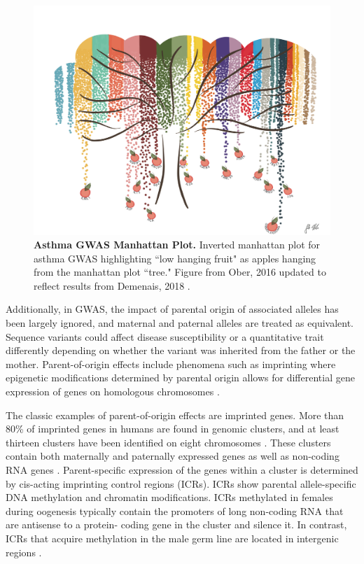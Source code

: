 \begin{figure}
\centering
\includegraphics[width=5in]{img/ch01/fig-01-lowhangingfruit.pdf}
\caption[Asthma GWAS Manhattan Plot.]{\textbf{Asthma GWAS Manhattan Plot.} Inverted manhattan plot for asthma GWAS highlighting ``low hanging fruit" as apples hanging from the manhattan plot ``tree." Figure from Ober, 2016 \cite{Ober:2016ga} updated to reflect results from Demenais, 2018 \cite{Demenais:2018hy}.}
\label{fig:fig-01-lowhangingfruit}
\end{figure}

Additionally, in GWAS, the impact of parental origin of associated alleles has been largely ignored, and maternal and paternal alleles are treated as equivalent. Sequence variants could affect disease susceptibility or a quantitative trait differently depending on whether the variant was inherited from the father or the mother. Parent-of-origin effects include phenomena such as imprinting where epigenetic modifications determined by parental origin allows for differential gene expression of genes on homologous chromosomes \cite{Lokody2014,Lawson2013}. 

The classic examples of parent-of-origin effects are imprinted genes. More than 80\% of imprinted genes in humans are found in genomic clusters, and at least thirteen clusters have been identified on eight chromosomes \cite{Lawson2013,Peters2014,Pires2014,Abramowitz2012}. These clusters contain both maternally and paternally expressed genes as well as non-coding RNA genes \cite{Peters2014,Abramowitz2012}. Parent-specific expression of the genes within a cluster is determined by cis-acting imprinting control regions (ICRs). ICRs show parental allele-specific DNA methylation and chromatin modifications. ICRs methylated in females during oogenesis typically contain the promoters of long non-coding RNA that are antisense to a protein- coding gene in the cluster and silence it. In contrast, ICRs that acquire methylation in the male germ line are located in intergenic regions \citep{Peters2014}.

